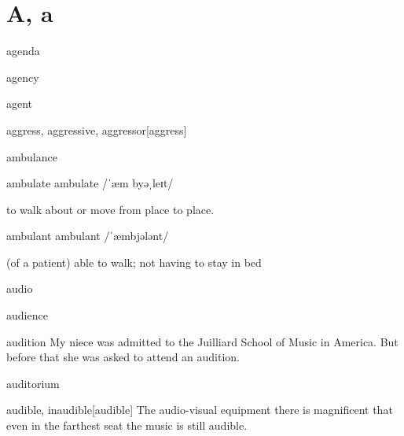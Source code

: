\section{A, a}

\begin{word}{agenda}
\end{word}

\begin{word}{agency}
\end{word}

\begin{word}{agent}
\end{word}

\begin{word}{aggress, aggressive, aggressor}[aggress]
\end{word}

\begin{word}{ambulance}
\end{word}

\begin{word}{ambulate} 
    ambulate /ˈæm byəˌleɪt/
    
    to walk about or move from place to place.
\end{word}

\begin{word}{ambulant} 
    ambulant /ˈæmbjələnt/
    
    (of a patient) able to walk; not having to stay in bed
\end{word}

\begin{word}{audio}
\end{word}

\begin{word}{audience}
\end{word}

\begin{word}{audition} 
    My  niece  was admitted  to  the Juilliard School of Music  in  America. But before that she was asked to attend an audition.
\end{word}

\begin{word}{auditorium}
\end{word}

\begin{word}{audible, inaudible}[audible]
    The audio-visual equipment there  is  magnificent that even  in the  farthest seat the music is still audible.
\end{word}


